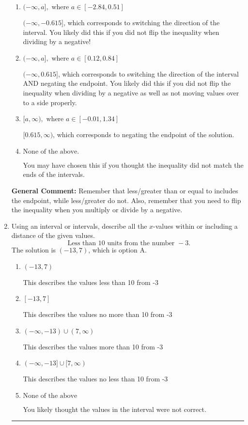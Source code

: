 \documentclass{extbook}[14pt]
\newcommand{\litem}[1]{\item #1

\rule{\textwidth}{0.4pt}}
\begin{document}
\begin{enumerate}
{\begin{enumerate}[label=\Alph*.]
* $[-0.615, \infty)$, which is the correct option.
\item \( (-\infty, a], \text{ where } a \in [-2.84, 0.51] \)

 $(-\infty, -0.615]$, which corresponds to switching the direction of the interval. You likely did this if you did not flip the inequality when dividing by a negative!
\item \( (-\infty, a], \text{ where } a \in [0.12, 0.84] \)

 $(-\infty, 0.615]$, which corresponds to switching the direction of the interval AND negating the endpoint. You likely did this if you did not flip the inequality when dividing by a negative as well as not moving values over to a side properly.
\item \( [a, \infty), \text{ where } a \in [-0.01, 1.34] \)

 $[0.615, \infty)$, which corresponds to negating the endpoint of the solution.
\item \( \text{None of the above}. \)

You may have chosen this if you thought the inequality did not match the ends of the intervals.
\end{enumerate}

\textbf{General Comment:} Remember that less/greater than or equal to includes the endpoint, while less/greater do not. Also, remember that you need to flip the inequality when you multiply or divide by a negative.
}
\litem{
Using an interval or intervals, describe all the $x$-values within or including a distance of the given values.
\[ \text{ Less than } 10 \text{ units from the number } -3. \]The solution is \( (-13, 7) \), which is option A.\begin{enumerate}[label=\Alph*.]
\item \( (-13, 7) \)

This describes the values less than 10 from -3
\item \( [-13, 7] \)

This describes the values no more than 10 from -3
\item \( (-\infty, -13) \cup (7, \infty) \)

This describes the values more than 10 from -3
\item \( (-\infty, -13] \cup [7, \infty) \)

This describes the values no less than 10 from -3
\item \( \text{None of the above} \)

You likely thought the values in the interval were not correct.
\end{enumerate}

}
\end{enumerate}
\end{document}
